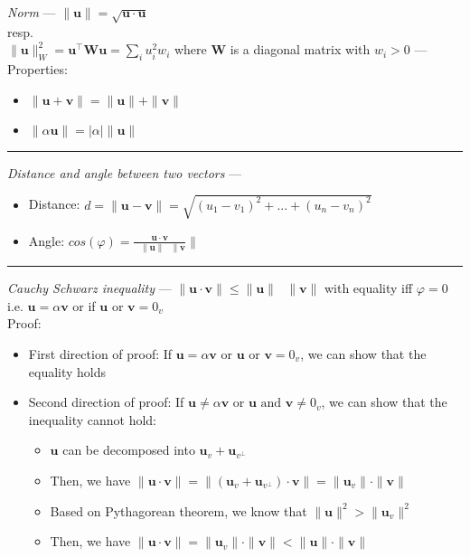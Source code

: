 \emph{Norm} --- 
$\|\boldsymbol{u}\| = \sqrt{\boldsymbol{u} \cdot \boldsymbol{u}}$\\
resp.\\
$\|\boldsymbol{u}\|_W^2 = \boldsymbol{u}^\intercal \boldsymbol{W} \boldsymbol{u} = \sum_i u_i^2 w_i$ where $\boldsymbol{W}$ is a diagonal matrix with $w_i > 0$ --- 
Properties:
\begin{multicols}{2}
\begin{itemize}
    \item $\|\boldsymbol{u}+\boldsymbol{v}\| = \|\boldsymbol{u}\| + \| \boldsymbol{v}\|$
    \item $\|\alpha\boldsymbol{u}\| = |\alpha| \|\boldsymbol{u}\|$
\end{itemize}
\end{multicols}

{\color{lightgray}\hrule height 0.001mm}

\emph{Distance and angle between two vectors} --- 
\begin{itemize}
    \item Distance: $d = \| \boldsymbol{u} - \boldsymbol{v} \| = \sqrt{(u_1 - v_1)^2+...+(u_n - v_n)^2}$
    \item Angle: $cos(\varphi) = \frac{\boldsymbol{u} \cdot \boldsymbol{v}}{\textrm{ } \|\boldsymbol{u}\| \textrm{ } 
 \|\boldsymbol{v}}\|$
\end{itemize}

{\color{lightgray}\hrule height 0.001mm}

\emph{Cauchy Schwarz inequality} --- 
$\|\boldsymbol{u} \cdot \boldsymbol{v}\| \leq \|\boldsymbol{u}\| \textrm{ } \|\boldsymbol{v}\|$ with equality iff $\varphi = 0$ i.e. $\boldsymbol{u} = \alpha\boldsymbol{v}$ or if $\boldsymbol{u} \textrm{ or } \boldsymbol{v} = 0_v$\\
Proof:
\begin{itemize}
    \item First direction of proof: If $\boldsymbol{u} = \alpha\boldsymbol{v}$ or $\boldsymbol{u} \textrm{ or } \boldsymbol{v} = 0_v$, we can show that the equality holds
    \item Second direction of proof: If $\boldsymbol{u} \neq \alpha\boldsymbol{v}$ or $\boldsymbol{u} \textrm{ and } \boldsymbol{v} \neq 0_v$, we can show that the inequality cannot hold:
    \begin{itemize}
        \item $\boldsymbol{u}$ can be decomposed into $\boldsymbol{u}_v + \boldsymbol{u}_{v^\bot}$
        \item Then, we have $\|\boldsymbol{u} \cdot \boldsymbol{v}\| = \| (\boldsymbol{u}_v + \boldsymbol{u}_{v^\bot}) \cdot \boldsymbol{v} \| = \|\boldsymbol{u}_v\| \cdot \|\boldsymbol{v}\|$
        \item Based on Pythagorean theorem, we know that $\|\boldsymbol{u}\|^2 > \|\boldsymbol{u}_v\|^2$
        \item Then, we have $\|\boldsymbol{u} \cdot \boldsymbol{v}\| = \|\boldsymbol{u}_v\| \cdot \|\boldsymbol{v}\| < \|\boldsymbol{u}\| \cdot \|\boldsymbol{v}\|$
    \end{itemize}
\end{itemize}

